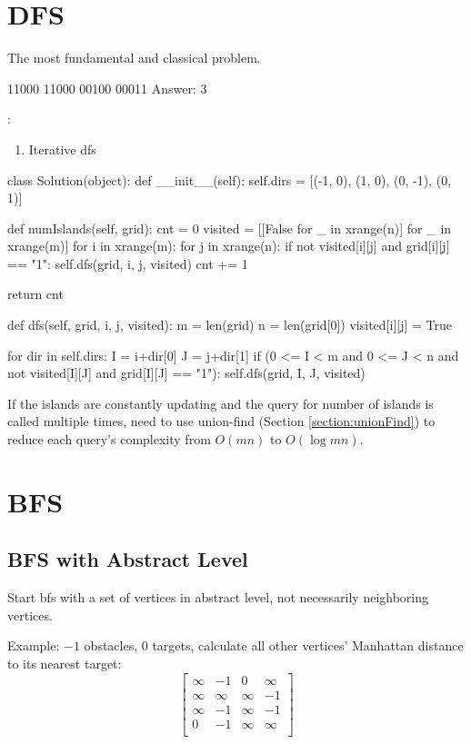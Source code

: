 \section{DFS}
 The most fundamental and classical problem. 
\begin{python}
11000
11000
00100
00011
Answer: 3
\end{python}
:
\begin{enumerate}
\item Iterative dfs
\end{enumerate}
\begin{python}
class Solution(object):
  def __init__(self):
    self.dirs = [(-1, 0), (1, 0), (0, -1), (0, 1)]

  def numIslands(self, grid):
    cnt = 0
    visited = [[False for _ in xrange(n)] 
               for _ in xrange(m)]
    for i in xrange(m):
      for j in xrange(n):
        if not visited[i][j] and grid[i][j] == "1":
          self.dfs(grid, i, j, visited)
          cnt += 1

    return cnt
\end{python}
\newpage
\begin{python}
  def dfs(self, grid, i, j, visited):
    m = len(grid)
    n = len(grid[0])
    visited[i][j] = True

    for dir in self.dirs:
      I = i+dir[0]
      J = j+dir[1]
      if (0 <= I < m and 0 <= J < n and 
        not visited[I][J] and grid[I][J] == "1"):
        self.dfs(grid, I, J, visited)
\end{python}
If the islands are constantly updating and the query for number of islands is called multiple times, need to use union-find (Section \ref{section:unionFind}) to reduce each query's complexity from $O(mn)$ to $O(\log mn)$.

\section{BFS}
\subsection{BFS with Abstract Level}
Start bfs with a set of vertices in abstract level, not necessarily neighboring vertices.

Example: $-1$ obstacles, $0$ targets, calculate all other vertices' Manhattan distance to its nearest target:
$$
\begin{bmatrix}
\infty & -1 & 0 & \infty \\
\infty & \infty & \infty & -1 \\
\infty & -1 & \infty & -1 \\
0 & -1 & \infty & \infty \\
\end{bmatrix} 
$$

